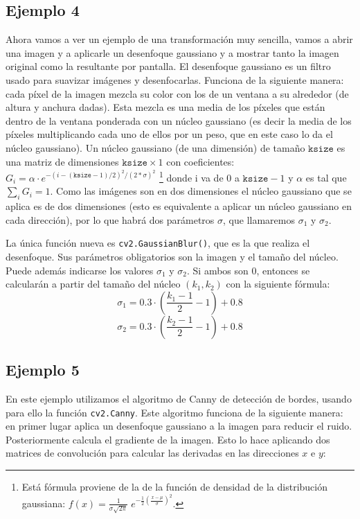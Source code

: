 \documentclass[a4paper,openright, 12pt]{book}
\begin{document}
\subsection*{Ejemplo 4}
Ahora vamos a ver un ejemplo de una transformación muy sencilla, vamos a abrir una imagen y a aplicarle un desenfoque gaussiano y a mostrar tanto la imagen original como la resultante por pantalla. El desenfoque gaussiano es un filtro usado para suavizar imágenes y desenfocarlas. Funciona de la siguiente manera: cada píxel de la imagen mezcla su color con los de un ventana a su alrededor (de altura y anchura dadas). Esta mezcla es una media de los píxeles que están dentro de la ventana ponderada con un núcleo gaussiano (es decir la media de los píxeles multiplicando cada uno de ellos por un peso, que en este caso lo da el núcleo gaussiano). Un núcleo gaussiano (de una dimensión) de tamaño $\texttt{ksize}$ es una matriz de dimensiones $ \texttt{ksize}\times1$ con coeficientes:
$ G_i= \alpha \cdot e^{-(i-( \texttt{ksize} -1)/2)^2/(2* \sigma )^2}$ \footnote{Está fórmula proviene de la de la función de densidad de la distribución gaussiana: $f(x)=\frac1{\sigma\sqrt{2\pi}}\; e^{ - \frac{1}{2} \left(\frac{x-\mu}{\sigma}\right)^2}$.} donde i va de $0$ a $\texttt{ksize}-1$ y $\alpha$ es tal que  $\sum_i G_i=1$. Como las imágenes son en dos dimensiones el núcleo gaussiano que se aplica es de dos dimensiones (esto es equivalente a aplicar un núcleo gaussiano en cada dirección), por lo que habrá dos parámetros $\sigma$, que llamaremos $\sigma_1$ y $\sigma_2$.

La única función nueva es 
\lstinline|cv2.GaussianBlur()|, que es la que realiza el desenfoque.
Sus parámetros obligatorios son la imagen y el tamaño del núcleo. Puede además indicarse los valores $\sigma_1$ y $\sigma_2$. Si ambos son 0, entonces se calcularán a partir del tamaño del núcleo $(k_1, k_2)$ con la siguiente fórmula:
\begin{equation*}
\sigma_1 = 0.3\cdot(\frac{k_1-1}{2} - 1) + 0.8
\end{equation*}
\begin{equation*}
\sigma_2 = 0.3\cdot(\frac{k_2-1}{2} - 1) + 0.8
\end{equation*}



\newpage

\subsection*{Ejemplo 5} \label{derivadas}
En este ejemplo utilizamos el algoritmo de Canny \cite{canny86} de detección de bordes, usando para ello la función \lstinline|cv2.Canny|.
 Este algoritmo funciona de la siguiente manera: en primer lugar aplica un desenfoque gaussiano a la imagen para reducir el ruido. Posteriormente calcula el gradiente de la imagen. Esto lo hace aplicando dos matrices de convolución para calcular las derivadas en las direcciones $x$ e $y$:
\end{document}
